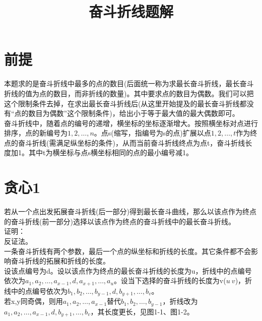 \documentclass{article}
\date{}
\title{奋斗折线题解}
\begin{document}
		\maketitle \vspace{-50pt}
		
		\section{前提}
			\indent 本题求的是奋斗折线中最多的点的数目(后面统一称为求最长奋斗折线，最长奋斗折线的值为点的数目，而非折线的数量)。其中要求点的数目为偶数。我们可以把这个限制条件去掉，在求出最长奋斗折线后(从这里开始提及的最长奋斗折线都没有“点的数目为偶数”这个限制条件)，给出小于等于最大值的最大偶数即可。\\
			
			\indent 奋斗折线中，随着点的编号的递增，横坐标的坐标逐渐增大。按照横坐标对点进行排序，点的新编号为$1,2,\dots,n$。点s(缩写，指编号为s的点)扩展以点$1,2,\dots,t$作为终点的奋斗折线(需满足纵坐标的条件)，从而当前奋斗折线终点为点t，奋斗折线长度加1。其中t为横坐标与点s横坐标相同的点的最小编号减1。\\
			
		\section{贪心1}		
			若从一个点出发拓展奋斗折线(后一部分)得到最长奋斗曲线，那么以该点作为终点的奋斗折线(前一部分)选择以该点作为终点的奋斗折线中的最长奋斗折线。\\
			
			\indent 证明：\\
			
			\indent 反证法。\\
			
			\indent 一条奋斗折线有两个参数，最后一个点的纵坐标和折线的长度。其它条件都不会影响奋斗折线的拓展和折线的长度。\\
			
			\indent 设该点编号为d。设以该点作为终点的最长奋斗折线的长度为u，折线中的点编号依次为$a_{1},a_{2},\dots,a_{x-1},d,a_{x+1},\dots,a_{u}$。设当下选择的奋斗折线的长度为v($u\>v$)，折线中的点编号依次为$b_{1},b_{2},\dots,b_{y-1},d,b_{y+1},\dots,b_{v}$。\\
			
			\indent 若x,y同奇偶，则用$a_{1},a_{2},\dots,a_{x-1}$替代$b_{1},b_{2},\dots,b_{y-1}$，折线改为$a_{1},a_{2},\dots,a_{x-1},d,b_{y+1},\dots,b_{v}$，其长度更长，见图1-1、图1-2。\\
			
\end{document}
